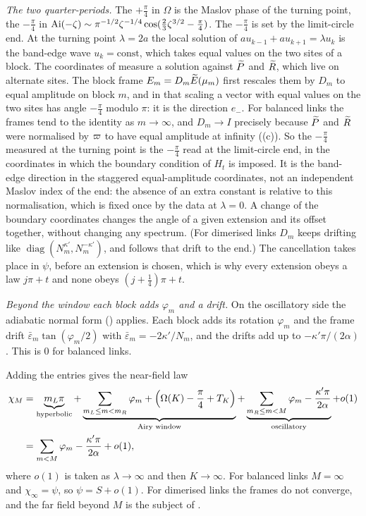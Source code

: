 \emph{The two quarter-periods.} The $+\frac\pi4$ in $\Omega$ is the Maslov phase of the
turning point, the $-\frac\pi4$ in $\operatorname{Ai}(-\zeta)\sim\pi^{-1/2}\zeta^{-1/4}\cos(\frac23\zeta^{3/2}-\frac\pi4)$.
The $-\frac\pi4$ is set by the limit-circle end. At the turning point $\lambda=2a$ the
local solution of $a u_{k-1}+au_{k+1}=\lambda u_k$ is the band-edge wave $u_k=\mathrm{const}$,
which takes equal values on the two sites of a block. The coordinates of
 measure a solution against $\widetilde P$ and $\widetilde R$, which live on alternate
sites. The block frame $E_m=D_m\widetilde E(\mu_m)$ first rescales them by $D_m$ to equal amplitude
on block $m$, and in that scaling a vector with equal values on the two sites has angle
$-\frac\pi4$ modulo $\pi$: it is the direction $e_-$. For balanced links the frames tend to
the identity as $m\to\infty$, and $D_m\to I$ precisely because $\widetilde P$ and $\widetilde R$ were normalised by $\varpi$ to have
equal amplitude at infinity ((c)). So the $-\frac\pi4$ measured at the
turning point is the $-\frac\pi4$ read at the limit-circle end, in the coordinates in which
the boundary condition of $H_t$ is imposed. It is the band-edge direction in the staggered
equal-amplitude coordinates, not an independent Maslov index of the end: the absence of an extra
constant is relative to this normalisation, which is fixed once by the data at $\lambda=0$. A change of
the boundary coordinates changes the angle of a given extension and its offset together, without
changing any spectrum. (For dimerised links $D_m$ keeps drifting
like $\operatorname{diag}(N_m^{\kappa'},N_m^{-\kappa'})$, and  follows that drift
to the end.) The cancellation takes place in $\psi$, before an extension is chosen, which is why every
extension obeys a law $j\pi+t$ and none obeys $(j+\frac14)\pi+t$.

\emph{Beyond the window each block adds $\varphi_m$ and a drift.} On the oscillatory side
the adiabatic normal form () applies. Each block adds its rotation
$\varphi_m$ and the frame drift $\bar\varepsilon_m\tan(\varphi_m/2)$ with
$\bar\varepsilon_m=-2\kappa'/N_m$, and the drifts add up to $-\kappa'\pi/(2\alpha)$. This is
$0$ for balanced links.

Adding the entries gives the near-field law
\begin{equation}\label{eq:budget}
\begin{aligned}
  \chi_M&=\underbrace{m_L\pi}_{\text{hyperbolic}}
  +\underbrace{\sum_{m_L\le m<m_R}\varphi_m+\Bigl(\Omega(K)-\frac\pi4+T_K\Bigr)}_{\text{Airy window}}
  +\underbrace{\sum_{m_R\le m<M}\varphi_m-\frac{\kappa'\pi}{2\alpha}}_{\text{oscillatory}}+o(1)\\
  &=\sum_{m<M}\varphi_m-\frac{\kappa'\pi}{2\alpha}+o(1),
\end{aligned}
\end{equation}
where $o(1)$ is taken as $\lambda\to\infty$ and then $K\to\infty$. For balanced links $M=\infty$
and $\chi_\infty=\psi$, so $\psi=S+o(1)$. For dimerised links the frames do not converge, and
the far field beyond $M$ is the subject of .

